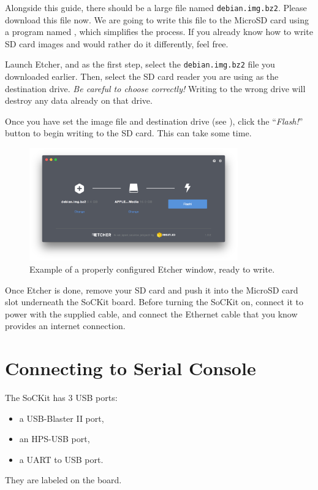 \documentclass{sockitguide}
\begin{document}
Alongside this guide, there should be a large file named
\texttt{debian.img.bz2}. Please download this file now. We are going
to write this file to the MicroSD card using a program named
, which simplifies the process. If
you already know how to write SD card images and would rather do it
differently, feel free.

Launch Etcher, and as the first step, select the
\texttt{debian.img.bz2} file you downloaded earlier. Then, select the
SD card reader you are using as the destination drive. \textit{Be
  careful to choose correctly!} Writing to the wrong drive will
destroy any data already on that drive.

Once you have set the image file and destination drive (see
), click the ``\textit{Flash!}'' button to begin writing
to the SD card. This can take some time.

\begin{figure}
  \includegraphics[width=9cm]{figures/etcher.png}
  \caption{Example of a properly configured Etcher window, ready to write.}
  \label{fig:etcher}
\end{figure}

Once Etcher is done, remove your SD card and push it into the MicroSD
card slot underneath the SoCKit board. Before turning the SoCKit on,
connect it to power with the supplied cable, and connect the Ethernet
cable that you know provides an internet connection.

\section{Connecting to Serial Console}

The SoCKit has \num{3} USB ports:
\begin{itemize}
\item a USB-Blaster II port,
\item an HPS-USB port,
\item a UART to USB port.
\end{itemize}
They are labeled on the board.
\end{document}
